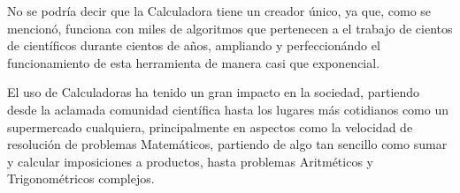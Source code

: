 \documentclass[12pt]{article}
\begin{document}
\begin{flushleft}
No se podría decir que la Calculadora tiene un creador único, ya que, como se mencionó, funciona con miles de algoritmos que pertenecen a el trabajo de cientos de científicos durante cientos de años, ampliando y perfeccionándo el funcionamiento de esta herramienta de manera casi que exponencial.

El uso de Calculadoras ha tenido un gran impacto en la sociedad, partiendo desde la aclamada comunidad científica hasta los lugares más cotidianos como un supermercado cualquiera, principalmente en aspectos como la velocidad de resolución de problemas Matemáticos, partiendo de algo tan sencillo como sumar y calcular imposiciones a productos, hasta problemas Aritméticos y Trigonométricos complejos.


\end{flushleft}
\end{document}
